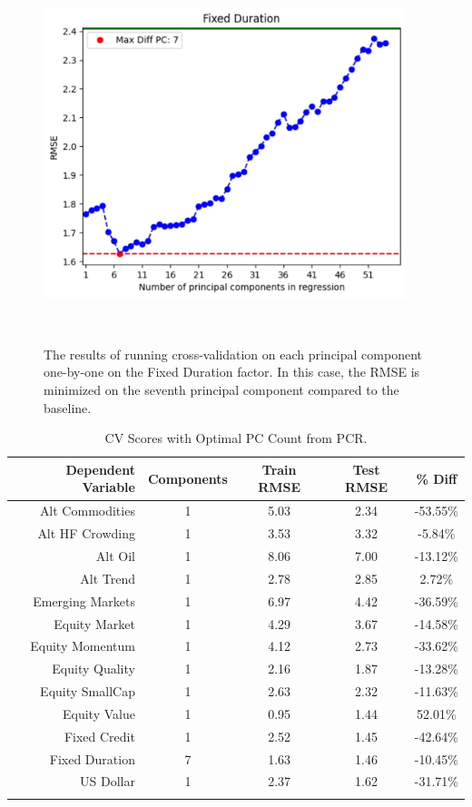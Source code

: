 \documentclass{ledger}
\begin{document}
\begin{figure}[!ht]
\centering
	\includegraphics[width=300pt]{FixedDuration_CV_PCA.pdf}
	\caption{The results of running cross-validation on each principal component one-by-one on the Fixed Duration factor. In this case, the RMSE is minimized on the seventh principal component compared to the baseline. \label{figure:fixed_duration_cv_pca}} ~\\
\end{figure}

\begin{table}[!ht]
	\centering
	\caption{CV Scores with Optimal PC Count from PCR.}
	\label{table:summary_cv_scores}
	\begin{tabularx}{350pt}{rcccc}
	\toprule
		\textbf{Dependent Variable} & \textbf{Components} & \textbf{Train RMSE} & \textbf{Test RMSE} & \textbf{\% Diff} \\
	\midrule
		Alt Commodities & 1 & 5.03 & 2.34 & -53.55\% \\
		Alt HF Crowding & 1 & 3.53 & 3.32 & -5.84\% \\
		Alt Oil & 1 & 8.06 & 7.00 & -13.12\% \\
		Alt Trend & 1 & 2.78 & 2.85 & 2.72\% \\
		Emerging Markets & 1 & 6.97 & 4.42 & -36.59\% \\
		Equity Market & 1 & 4.29 & 3.67 & -14.58\% \\
		Equity Momentum & 1 & 4.12 & 2.73 & -33.62\% \\
		Equity Quality & 1 & 2.16 & 1.87 & -13.28\% \\
		Equity SmallCap & 1 & 2.63 & 2.32 & -11.63\% \\
		Equity Value & 1 & 0.95 & 1.44 & 52.01\% \\
		Fixed Credit & 1 & 2.52 & 1.45 & -42.64\% \\
		Fixed Duration & 7 & 1.63 & 1.46 & -10.45\% \\
		US Dollar & 1 & 2.37 & 1.62 & -31.71\% \\
	\bottomrule \\
	\end{tabularx} 
\end{table} 
\end{document}
